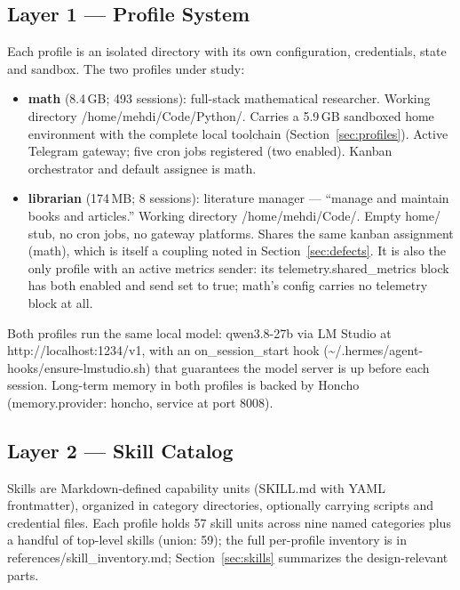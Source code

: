 \documentclass[10pt]{article}
\newcommand{\mono}[1]{{\ttfamily\small #1}}
\begin{document}
\subsection*{Layer 1 --- Profile System}
Each profile is an isolated directory with its own configuration, credentials, state and sandbox.
The two profiles under study:

\begin{itemize}
    \item \textbf{\mono{math}} (8.4\,GB; 493 sessions): full-stack mathematical researcher.
    Working directory \mono{/home/mehdi/Code/Python/}. Carries a 5.9\,GB sandboxed home
    environment with the complete local toolchain (Section~\ref{sec:profiles}). Active Telegram
    gateway; five cron jobs registered (two enabled). Kanban orchestrator and default assignee is \mono{math}.
    \item \textbf{\mono{librarian}} (174\,MB; 8 sessions): literature manager --- ``manage and
    maintain books and articles.'' Working directory \mono{/home/mehdi/Code/}. Empty \mono{home/}
    stub, no cron jobs, no gateway platforms. Shares the same kanban assignment (\mono{math}), which
    is itself a coupling noted in Section~\ref{sec:defects}. It is also the only profile with an active
    metrics sender: its \mono{telemetry.shared\_metrics} block has both \mono{enabled} and \mono{send}
    set to true; math's config carries no telemetry block at all.
\end{itemize}

Both profiles run the same local model: \mono{qwen3.8-27b} via LM Studio at
\mono{http://localhost:1234/v1}, with an \mono{on\_session\_start} hook
(\mono{\textasciitilde/.hermes/agent-hooks/ensure-lmstudio.sh}) that guarantees the model server
is up before each session. Long-term memory in both profiles is backed by Honcho
(\mono{memory.provider: honcho}, service at port 8008).

\subsection*{Layer 2 --- Skill Catalog}
Skills are Markdown-defined capability units (\mono{SKILL.md} with YAML frontmatter), organized
in category directories, optionally carrying scripts and credential files. Each profile holds 57
skill units across nine named categories plus a handful of top-level skills (union: 59); the full
per-profile inventory is in \mono{references/skill\_inventory.md}; Section~\ref{sec:skills} summarizes
the design-relevant parts.
\end{document}
